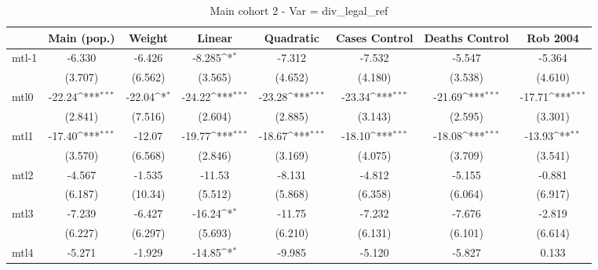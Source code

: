 \documentclass{article}
\begin{document}
{
\def\sym#1{\ifmmode^{#1}\else\(^{#1}\)\fi}
\begin{longtable}{l*{7}{c}}
\caption{Main cohort 2 - Var = div\_legal\_ref}\\
\hline\hline\endfirsthead\hline\endhead\hline\endfoot\endlastfoot
                &\multicolumn{1}{c}{Main (pop.)}&\multicolumn{1}{c}{Weight}&\multicolumn{1}{c}{Linear}&\multicolumn{1}{c}{Quadratic}&\multicolumn{1}{c}{Cases Control}&\multicolumn{1}{c}{Deaths Control}&\multicolumn{1}{c}{Rob 2004}\\
\hline
mtl-1           &   -6.330         &   -6.426         &   -8.285\sym{*}  &   -7.312         &   -7.532         &   -5.547         &   -5.364         \\
                &  (3.707)         &  (6.562)         &  (3.565)         &  (4.652)         &  (4.180)         &  (3.538)         &  (4.610)         \\
mtl0            &   -22.24\sym{***}&   -22.04\sym{*}  &   -24.22\sym{***}&   -23.28\sym{***}&   -23.34\sym{***}&   -21.69\sym{***}&   -17.71\sym{***}\\
                &  (2.841)         &  (7.516)         &  (2.604)         &  (2.885)         &  (3.143)         &  (2.595)         &  (3.301)         \\
mtl1            &   -17.40\sym{***}&   -12.07         &   -19.77\sym{***}&   -18.67\sym{***}&   -18.10\sym{***}&   -18.08\sym{***}&   -13.93\sym{**} \\
                &  (3.570)         &  (6.568)         &  (2.846)         &  (3.169)         &  (4.075)         &  (3.709)         &  (3.541)         \\
mtl2            &   -4.567         &   -1.535         &   -11.53         &   -8.131         &   -4.812         &   -5.155         &   -0.881         \\
                &  (6.187)         &  (10.34)         &  (5.512)         &  (5.868)         &  (6.358)         &  (6.064)         &  (6.917)         \\
mtl3            &   -7.239         &   -6.427         &   -16.24\sym{*}  &   -11.75         &   -7.232         &   -7.676         &   -2.819         \\
                &  (6.227)         &  (6.297)         &  (5.693)         &  (6.210)         &  (6.131)         &  (6.101)         &  (6.614)         \\
mtl4            &   -5.271         &   -1.929         &   -14.85\sym{*}  &   -9.985         &   -5.120         &   -5.827         &    0.133         \\

\end{longtable}}
\end{document}
